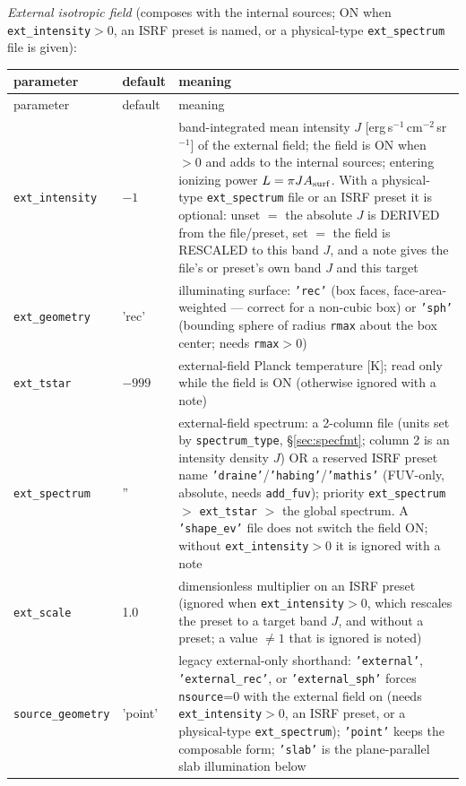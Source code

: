 \documentclass[english,a4paper]{my_memo}
\newcommand{\code}[1]{\texttt{#1}}
\begin{document}
\noindent\emph{External isotropic field} (composes with the internal
sources; ON when \code{ext\_intensity}$>0$, an ISRF preset is named, or a
physical-type \code{ext\_spectrum} file is given):
{\small
\begin{longtable}{llp{7.2cm}}
\toprule
parameter & default & meaning \\
\midrule
\endfirsthead
\toprule
parameter & default & meaning \\
\midrule
\endhead
\bottomrule
\endlastfoot
\code{ext\_intensity} & $-1$ & band-integrated mean intensity $J$ [erg\,s$^{-1}$\,cm$^{-2}$\,sr$^{-1}$] of the external field; the field is ON when $>0$ and adds to the internal sources; entering ionizing power $L = \pi J A_{\rm surf}$.  With a physical-type \code{ext\_spectrum} file or an ISRF preset it is optional: unset $=$ the absolute $J$ is DERIVED from the file/preset, set $=$ the field is RESCALED to this band $J$, and a note gives the file's or preset's own band $J$ and this target \\
\code{ext\_geometry} & 'rec' & illuminating surface: \code{'rec'} (box faces, face-area-weighted --- correct for a non-cubic box) or \code{'sph'} (bounding sphere of radius \code{rmax} about the box center; needs \code{rmax}$>0$) \\
\code{ext\_tstar} & $-999$ & external-field Planck temperature [K]; read only while the field is ON (otherwise ignored with a note) \\
\code{ext\_spectrum} & '' & external-field spectrum: a 2-column file (units set by \code{spectrum\_type}, \S\ref{sec:specfmt}; column 2 is an intensity density $J$) OR a reserved ISRF preset name \code{'draine'}/\code{'habing'}/\code{'mathis'} (FUV-only, absolute, needs \code{add\_fuv}); priority \code{ext\_spectrum} $>$ \code{ext\_tstar} $>$ the global spectrum.  A \code{'shape\_ev'} file does not switch the field ON; without \code{ext\_intensity}$>0$ it is ignored with a note \\
\code{ext\_scale} & 1.0 & dimensionless multiplier on an ISRF preset (ignored when \code{ext\_intensity}$>0$, which rescales the preset to a target band $J$, and without a preset; a value $\ne 1$ that is ignored is noted) \\
\code{source\_geometry} & 'point' & legacy external-only shorthand: \code{'external'}, \code{'external\_rec'}, or \code{'external\_sph'} forces \code{nsource}=0 with the external field on (needs \code{ext\_intensity}$>0$, an ISRF preset, or a physical-type \code{ext\_spectrum}); \code{'point'} keeps the composable form; \code{'slab'} is the plane-parallel slab illumination below \\
\end{longtable}
}
\end{document}
